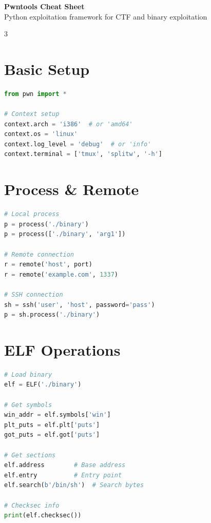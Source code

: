 \documentclass[10pt,landscape,a4paper]{article}
\begin{document}
\begin{center}
    {\Huge\bfseries\color{sectioncolor} Pwntools Cheat Sheet}\\
    \vspace{0.2cm}
    {\large Python exploitation framework for CTF and binary exploitation}
\end{center}

\begin{multicols}{3}
\setlength{\premulticols}{1pt}
\setlength{\postmulticols}{1pt}
\setlength{\multicolsep}{1pt}
\setlength{\columnsep}{1.5em}

\section*{Basic Setup}
\begin{lstlisting}[language=Python]
from pwn import *

# Context setup
context.arch = 'i386'  # or 'amd64'
context.os = 'linux'
context.log_level = 'debug'  # or 'info'
context.terminal = ['tmux', 'splitw', '-h']
\end{lstlisting}

\section*{Process \& Remote}
\begin{lstlisting}[language=Python]
# Local process
p = process('./binary')
p = process(['./binary', 'arg1'])

# Remote connection
r = remote('host', port)
r = remote('example.com', 1337)

# SSH connection
sh = ssh('user', 'host', password='pass')
p = sh.process('./binary')
\end{lstlisting}

\section*{ELF Operations}
\begin{lstlisting}[language=Python]
# Load binary
elf = ELF('./binary')

# Get symbols
win_addr = elf.symbols['win']
plt_puts = elf.plt['puts']
got_puts = elf.got['puts']

# Get sections
elf.address        # Base address
elf.entry          # Entry point
elf.search(b'/bin/sh')  # Search bytes

# Checksec info
print(elf.checksec())
\end{lstlisting}


\end{multicols}
\end{document}

